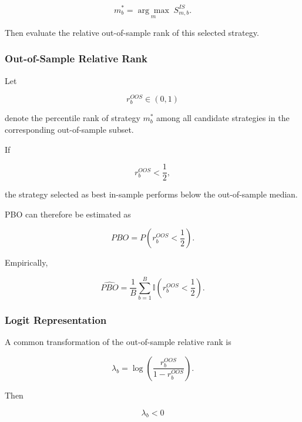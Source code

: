 \documentclass[11pt,a4paper]{article}
\begin{document}
\begin{equation}
\boxed{
m_b^*
=
\underset{m}{\arg\max}
\;
S_{m,b}^{IS}.
}
\end{equation}

Then evaluate the relative out-of-sample rank of this selected strategy.


\subsubsection{Out-of-Sample Relative Rank}

Let

\begin{equation}
r_b^{OOS}
\in
(0,1)
\end{equation}

denote the percentile rank of strategy $m_b^*$ among all candidate strategies
in the corresponding out-of-sample subset.

If

\begin{equation}
r_b^{OOS}
<
\frac{1}{2},
\end{equation}

the strategy selected as best in-sample performs below the out-of-sample median.

PBO can therefore be estimated as

\begin{equation}
\boxed{
PBO
=
P
\left(
r_b^{OOS}
<
\frac{1}{2}
\right).
}
\end{equation}

Empirically,

\begin{equation}
\boxed{
\widehat{PBO}
=
\frac{1}{B}
\sum_{b=1}^{B}
\mathbb{I}
\left(
r_b^{OOS}
<
\frac{1}{2}
\right).
}
\end{equation}


\subsubsection{Logit Representation}

A common transformation of the out-of-sample relative rank is

\begin{equation}
\boxed{
\lambda_b
=
\log
\left(
\frac{
r_b^{OOS}
}{
1-r_b^{OOS}
}
\right).
}
\end{equation}

Then

\begin{equation}
\lambda_b<0
\end{equation}
\end{document}
